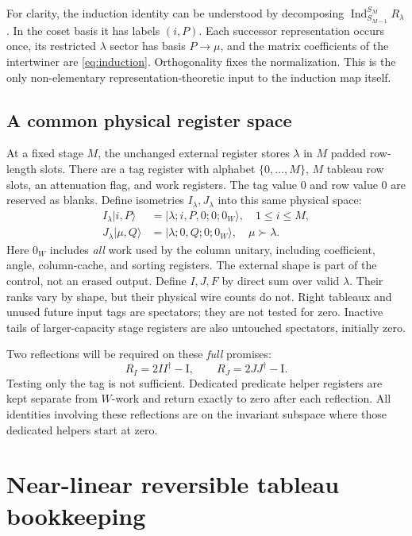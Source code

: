\documentclass[11pt]{article}
\theoremstyle{definition}
\newcommand{\ket}[1]{\lvert #1\rangle}
\newcommand{\Id}{\mathrm I}
\begin{document}
For clarity, the induction identity can be understood by decomposing
$\operatorname{Ind}_{S_{M-1}}^{S_M}R_\lambda$. In the coset basis it has
labels $(i,P)$. Each successor representation occurs once, its restricted
$\lambda$ sector has basis $P\to\mu$, and the matrix coefficients of the
intertwiner are \eqref{eq:induction}. Orthogonality fixes the normalization.
This is the only non-elementary representation-theoretic input to the
induction map itself.

\subsection{A common physical register space}

At a fixed stage $M$, the unchanged external register stores $\lambda$ in
$M$ padded row-length slots. There are a tag register with alphabet
$\{0,\ldots,M\}$, $M$ tableau row slots, an attenuation flag, and work
registers. The tag value $0$ and row value $0$ are reserved as blanks.
Define isometries $I_\lambda,J_\lambda$ into this same physical space:
\begin{align*}
 I_\lambda\ket{i,P}&=\ket{\lambda;i,P,0;0;0_{W}},\quad 1\le i\le M,\\
 J_\lambda\ket{\mu,Q}&=\ket{\lambda;0,Q;0;0_{W}},\quad\mu\succ\lambda.
\end{align*}
Here $0_W$ includes \emph{all} work used by the column unitary, including
coefficient, angle, column-cache, and sorting registers. The external shape
is part of the control, not an erased output. Define $I,J,F$ by direct sum
over valid $\lambda$. Their ranks vary by shape, but their physical wire
counts do not. Right tableaux and unused future input tags are spectators;
they are not tested for zero. Inactive tails of larger-capacity stage
registers are also untouched spectators, initially zero.

Two reflections will be required on these \emph{full} promises:
\begin{equation}\label{eq:reflect}
 R_I=2II^\dagger-\Id,\qquad R_J=2JJ^\dagger-\Id.
\end{equation}
Testing only the tag is not sufficient. Dedicated predicate helper registers
are kept separate from $W$-work and return exactly to zero after each
reflection. All identities involving these reflections are on the invariant
subspace where those dedicated helpers start at zero.

\section{Near-linear reversible tableau bookkeeping}\label{sec:bookkeeping}
\end{document}
